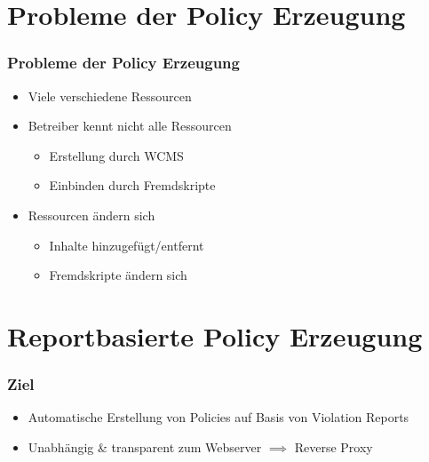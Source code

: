 \documentclass[handout]{beamer}
\begin{document}
\section{Probleme der Policy Erzeugung}
\begin{frame}[c]
\frametitle{Probleme der Policy Erzeugung}
\begin{itemize}
\item Viele verschiedene Ressourcen
\item Betreiber kennt nicht alle Ressourcen
\begin{itemize}
\item Erstellung durch WCMS
\item Einbinden durch Fremdskripte
\end{itemize}
\item Ressourcen ändern sich
\begin{itemize}
\item Inhalte hinzugefügt/entfernt
\item Fremdskripte ändern sich
\end{itemize}
\end{itemize}
\end{frame}

\section{Reportbasierte Policy Erzeugung}

\begin{frame}[c]
\frametitle{Ziel}
\begin{itemize}
\item Automatische Erstellung von Policies auf Basis von Violation Reports
\item Unabhängig \& transparent zum Webserver $\implies$ Reverse Proxy
\end{itemize}
\end{frame}
\end{document}
